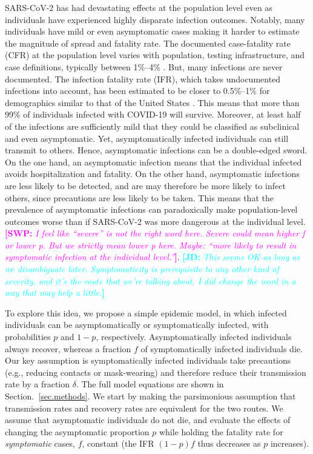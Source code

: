 \documentclass[12pt]{article}
\newcommand{\comment}{\showcomment}
\newcommand{\showcomment}[3]{\textcolor{#1}{\textbf{[#2: }\textsl{#3}\textbf{]}}}
\newcommand{\jd}[1]{\comment{cyan}{JD}{#1}}
\newcommand{\swp}[1]{\comment{magenta}{SWP}{#1}}
\begin{document}
SARS-CoV-2 has had devastating effects at the population level even as individuals have experienced highly disparate infection outcomes.
Notably, many individuals have mild or even asymptomatic cases making it harder to estimate the magnitude of spread and fatality rate. 
The documented case-fatality rate (CFR) at the population level varies with population, testing infrastructure, and case definitions, typically between 1\%--4\% \citep{rajgor2020many,VERITY2020669,yang2020early}.
But, many infections are never documented. 
The infection fatality rate (IFR), which takes undocumented infections into account, has been estimated to be closer to 0.5\%--1\% for demographics similar to that of the United States \citep{levin2020assessing}. 
This means that more than 99\% of individuals infected with COVID-19 will survive. 
Moreover, at least half of the infections are sufficiently mild that they could be classified as subclinical and even asymptomatic. 
Yet, asymptomatically infected individuals can still transmit to others. 
Hence, asymptomatic infections can be a double-edged sword. 
On the one hand, an asymptomatic infection means that the individual infected avoids hospitalization and fatality. 
On the other hand, asymptomatic infections are less likely to be detected, and are may therefore be more likely to infect others, since precautions are less likely to be taken.
This means that the prevalence of asymptomatic infections can paradoxically make population-level outcomes worse than if SARS-CoV-2 was more dangerous at the individual level.
\swp{I feel like ``severe'' is not the right word here. Severe could mean higher f or lower p. But we strictly mean lower p here. Maybe: ``more likely to result in symptomatic infection at the individual level.''}.
\jd{This seems OK as long as we disambiguate later. Symptomaticity is prerequisite to any other kind of severity, and it's the route that we're talking about. I did change the word in a way that may help a little.}

To explore this idea, we propose a simple epidemic model,
in which infected individuals can be asymptomatically or symptomatically infected, with probabilities $p$ and $1-p$, respectively.  
Asymptomatically infected individuals always recover, whereas a fraction $f$ of symptomatically infected individuals die.
Our key assumption is symptomatically infected individuals  take precautions (e.g., reducing contacts or mask-wearing) and therefore reduce their transmission rate by a fraction $\delta$. 
The full model equations are shown in Section.~\ref{sec.methods}. We start by making the parsimonious assumption that 
transmission rates and recovery rates are equivalent for the two routes. 
We assume that asymptomatic individuals do not die, and evaluate the effects of changing the asymptomatic proportion $p$ while holding the fatality rate for \emph{symptomatic} cases, $f$, constant (the IFR $(1-p)f$ thus decreases as $p$ increases).
\end{document}
